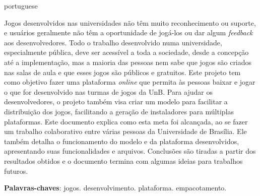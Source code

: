 \begin{resumo}[Resumo]
 \begin{otherlanguage*}{portuguese}

Jogos desenvolvidos nas universidades não têm muito reconhecimento ou suporte, e usuários geralmente não têm a oportunidade de jogá-los ou dar algum \textit{feedback} aos desenvolvedores. Todo o trabalho desenvolvido numa universidade, especialmente pública, deve ser acessível a toda a sociedade, desde a concepção até a implementação, mas a maioria das pessoas nem sabe que jogos são criados nas salas de aula e que esses jogos são públicos e gratuitos. Este projeto tem como objetivo fazer uma plataforma \textit{online} que permita às pessoas baixar e jogar o que for desenvolvido nas turmas de jogos da UnB. Para ajudar os desenvolvedores, o projeto também visa criar um modelo para facilitar a distribuição dos jogos, facilitando a geração de instaladores para múltiplas plataformas. Este documento explica como esta meta foi alcançada, ao se fazer um trabalho colaborativo entre várias pessoas da Universidade de Brasília. Ele também detalha o funcionamento do modelo e da plataforma desenvolvidos, apresentando suas funcionalidades e arquivos. Conclusões são tiradas a partir dos resultados obtidos e o documento termina com algumas ideias para trabalhos futuros.

 \vspace{\onelineskip}

 \noindent
 \textbf{Palavras-chaves}: jogos. desenvolvimento. plataforma. empacotamento.
 \end{otherlanguage*}
\end{resumo}
